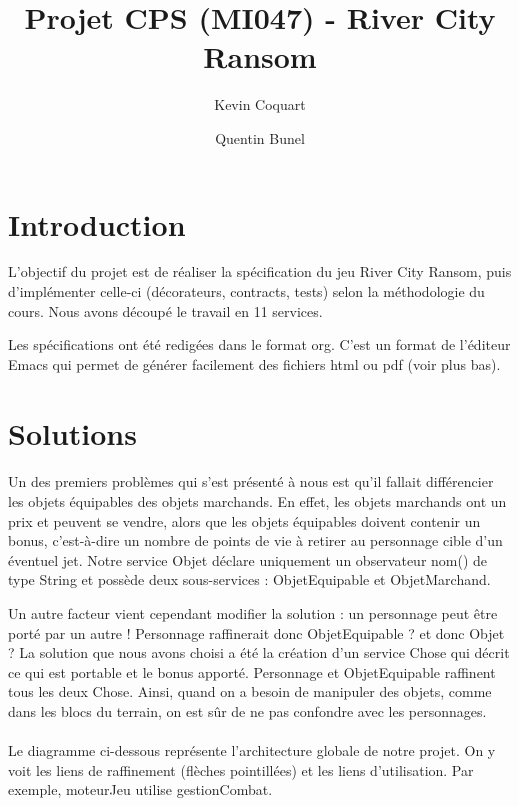 \documentclass[a4paper,titlepage,openany,12pt]{report}
\title{Projet CPS (MI047) - River City Ransom}
\author{Kevin Coquart \and Quentin Bunel}
\begin{document}
\maketitle

\section*{Introduction}

L'objectif du projet est de réaliser la spécification du jeu River City Ransom,
puis d'implémenter celle-ci (décorateurs, contracts, tests) selon la méthodologie du cours.
Nous avons découpé le travail en 11 services.

Les spécifications ont été redigées dans le format org. C'est un format de l'éditeur Emacs
qui permet de générer facilement des fichiers html ou pdf (voir plus bas).

\section*{Solutions}

\paragraph{}
Un des premiers problèmes qui s'est présenté à nous est qu'il fallait différencier les objets équipables
des objets marchands. En effet, les objets marchands ont un prix et peuvent se vendre, alors que les objets 
équipables doivent contenir un bonus, c'est-à-dire un nombre de points de vie à retirer au personnage cible 
d'un éventuel jet. Notre service Objet déclare uniquement un observateur nom() de type String et possède deux 
sous-services : ObjetEquipable et ObjetMarchand.

Un autre facteur vient cependant modifier la solution : un personnage peut être porté par un autre !
Personnage raffinerait donc ObjetEquipable ? et donc Objet ?
La solution que nous avons choisi a été la création d'un service Chose qui décrit ce qui est portable et 
le bonus apporté. Personnage et ObjetEquipable raffinent tous les deux Chose.
Ainsi, quand on a besoin de manipuler des objets, comme dans les blocs du terrain, on est sûr de ne pas
confondre avec les personnages.

\paragraph{}
Le diagramme ci-dessous représente l'architecture globale de notre projet.
On y voit les liens de raffinement (flèches pointillées) et les liens d'utilisation.
Par exemple, moteurJeu utilise gestionCombat.
\end{document}

